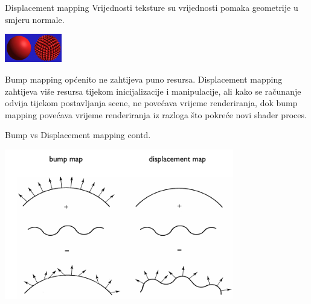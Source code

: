 \documentclass[9pt]{beamer}
\begin{document}
%
\begin{frame}{Displacement mapping}
	Vrijednosti teksture su vrijednosti pomaka geometrije u smjeru normale.
	\begin{center}
		\includegraphics[width=2.5cm]{slike/displacement_map.png}
	\end{center}
	\begin{block}{}
		Bump mapping općenito ne zahtijeva puno resursa. Displacement mapping zahtijeva više resursa tijekom
		inicijalizacije i manipulacije, ali kako se računanje odvija tijekom postavljanja scene, ne povećava vrijeme renderiranja, dok bump mapping povećava vrijeme renderiranja iz razloga što pokreće novi shader proces.
	\end{block}
	
	
\end{frame}
%
%	
%
\begin{frame}{Bump vs Displacement mapping contd.}
	\begin{center}
		\includegraphics[width=10cm]{slike/03_bump_vs_displacement_mapping.png}
	\end{center}
\end{frame}
\end{document}
